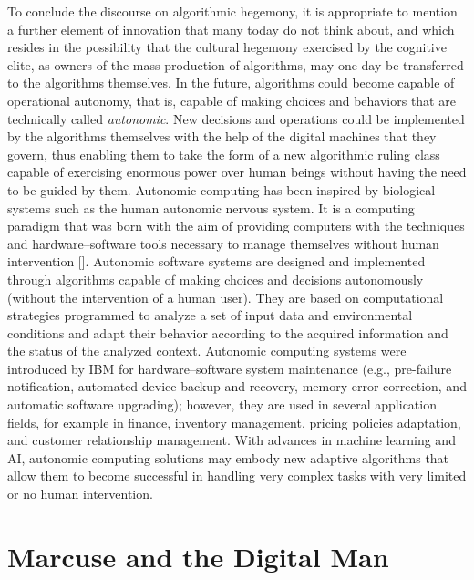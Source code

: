 To conclude the discourse on algorithmic hegemony, it is appropriate to mention a further element of innovation that many today do not think about, and which resides in the possibility that the cultural hegemony exercised by the cognitive elite, as owners of the mass production of algorithms, may one day be transferred to the algorithms themselves. In the future, algorithms could become capable of operational autonomy, that is, capable of making choices and behaviors that are technically called \textit{autonomic}. New decisions and operations could be implemented by the algorithms themselves with the help of the digital machines that they govern, thus enabling them to take the form of a new algorithmic ruling class capable of exercising enormous power over human beings without having the need to be guided by them. Autonomic computing has been inspired by biological systems such as the human autonomic nervous system. It is a computing paradigm that was born with the aim of providing computers with the techniques and hardware--software tools necessary to manage themselves without human intervention [\citealt{chap:8:ParasharandHariri:2007}]. Autonomic software systems are designed and implemented through algorithms capable of making choices and decisions autonomously (without the intervention of a human user). They are based on computational strategies programmed to analyze a set of input data and environmental conditions and adapt their behavior according to the acquired information and the status of the analyzed context. Autonomic computing systems were introduced by IBM for hardware--software system maintenance (e.g., pre-failure notification, automated device backup and recovery, memory error correction, and automatic software upgrading); however, they are used in several application fields, for example in finance, inventory management, pricing policies adaptation, and customer relationship management. With advances in machine learning and AI, autonomic computing solutions may embody new adaptive algorithms that allow them to become successful in handling very complex tasks with very limited or no human intervention.

\section{\label{sec:8.4}Marcuse and the Digital Man}

